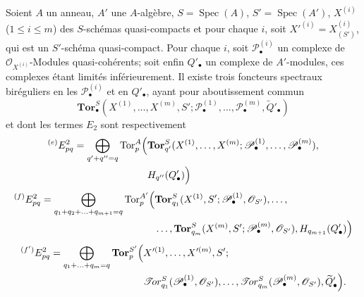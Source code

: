 \begin{corollary}[6.9.4]
Soient $A$ un anneau, $A'$ une $A$-algèbre,
$S=\operatorname{Spec}(A)$, $S'=\operatorname{Spec}(A')$,
$X^{(i)}$ ($1\leq i\leq m$) des $S$-schémas quasi-compacts et pour chaque
$i$, soit $X'^{(i)}=X_{(S')}^{(i)}$, qui est un $S'$-schéma quasi-compact.
Pour chaque $i$, soit $\mathscr P_\bullet^{(i)}$ un complexe de
$\mathscr O_{X^{(i)}}$-Modules quasi-cohérents; soit enfin $Q'_\bullet$ un
complexe de $A'$-modules, ces complexes étant limités inférieurement. Il
existe trois foncteurs spectraux biréguliers en les
$\mathscr P_\bullet^{(i)}$ et en $Q'_\bullet$, ayant pour aboutissement commun
\[
  \mathbf{Tor}_\bullet^S
  (X^{(1)},\ldots,X^{(m)},S';
   \mathscr P_\bullet^{(1)},\ldots,\mathscr P_\bullet^{(m)},
   \widetilde{Q}'_\bullet)
\]
et dont les termes $E_2$ sont respectivement
\[
\begin{split}
  {}^{(e)}E_{pq}^2
  =\bigoplus_{q'+q''=q}
  \operatorname{Tor}_p^A\Bigl(
  &\mathbf{Tor}_{q'}^S
  (X^{(1)},\ldots,X^{(m)};
   \mathscr P_\bullet^{(1)},\ldots,\mathscr P_\bullet^{(m)}),\\
  &H_{q''}(Q'_\bullet)
  \Bigr)
\end{split}
\]
\[
\begin{split}
  {}^{(f)}E_{pq}^2
  =\bigoplus_{q_1+q_2+\ldots+q_{m+1}=q}
  \operatorname{Tor}_p^{A'}\Bigl(
  &\mathbf{Tor}_{q_1}^S
  (X^{(1)},S';\mathscr P_\bullet^{(1)},\mathscr O_{S'}),\ldots,\\
  &\ldots,\mathbf{Tor}_{q_m}^S
  (X^{(m)},S';\mathscr P_\bullet^{(m)},\mathscr O_{S'}),
  H_{q_{m+1}}(Q'_\bullet)
  \Bigr)
\end{split}
\]
\[
\begin{split}
  {}^{(f')}E_{pq}^2
  =\bigoplus_{q_1+\ldots+q_m=q}
  \mathbf{Tor}_p^{S'}\Bigl(
  &X'^{(1)},\ldots,X'^{(m)},S';\\
  &\mathscr{T}\!or_{q_1}^S
  (\mathscr P_\bullet^{(1)},\mathscr O_{S'}),\ldots,
  \mathscr{T}\!or_{q_m}^S
  (\mathscr P_\bullet^{(m)},\mathscr O_{S'}),
  \widetilde{Q}'_\bullet
  \Bigr).
\end{split}
\]
\end{corollary}

